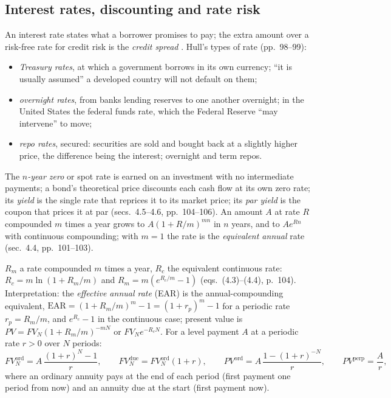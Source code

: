 \subsection{Interest rates, discounting and rate risk}

\begin{qfdefinition}\label{def:interest-rate-measures}
 An interest rate states what a borrower promises to pay; the extra amount over a risk-free rate for credit risk is the \emph{credit spread} \citep[chap.~4, ``Interest Rates'', sec.~4.1, p.~98]{s7-hulloptions}. Hull's types of rate (pp.~98--99):
\begin{itemize}
\item \emph{Treasury rates}, at which a government borrows in its own currency; ``it is usually assumed'' a developed country will not default on them;
\item \emph{overnight rates}, from banks lending reserves to one another overnight; in the United States the federal funds rate, which the Federal Reserve ``may intervene'' to move;
\item \emph{repo rates}, secured: securities are sold and bought back at a slightly higher price, the difference being the interest; overnight and term repos.
\end{itemize}
The \emph{$n$-year zero} or spot rate is earned on an investment with no intermediate payments; a bond's theoretical price discounts each cash flow at its own zero rate; its \emph{yield} is the single rate that reprices it to its market price; its \emph{par yield} is the coupon that prices it at par (secs.~4.5--4.6, pp.~104--106). An amount $A$ at rate $R$ compounded $m$ times a year grows to $A(1+R/m)^{mn}$ in $n$ years, and to $Ae^{Rn}$ with continuous compounding; with $m=1$ the rate is the \emph{equivalent annual} rate (sec.~4.4, pp.~101--103).

 $R_m$ a rate compounded $m$ times a year, $R_c$ the equivalent continuous rate: $R_c=m\ln(1+R_m/m)$ and $R_m=m(e^{R_c/m}-1)$ (eqs.~(4.3)--(4.4), p.~104). Interpretation: the \emph{effective annual rate} (EAR) is the annual-compounding equivalent, $\mathrm{EAR}=(1+R_m/m)^m-1=(1+r_p)^m-1$ for a periodic rate $r_p=R_m/m$, and $e^{R_c}-1$ in the continuous case; present value is $PV=FV_N(1+R_m/m)^{-mN}$ or $FV_Ne^{-R_cN}$. For a level payment $A$ at a periodic rate $r>0$ over $N$ periods:
\[ FV^{\mathrm{ord}}_N=A\,\frac{(1+r)^N-1}{r},\qquad FV^{\mathrm{due}}_N=FV^{\mathrm{ord}}_N(1+r),\qquad PV^{\mathrm{ord}}=A\,\frac{1-(1+r)^{-N}}{r},\qquad PV^{\mathrm{perp}}=\frac Ar, \]
where an ordinary annuity pays at the end of each period (first payment one period from now) and an annuity due at the start (first payment now).


\end{qfdefinition}
